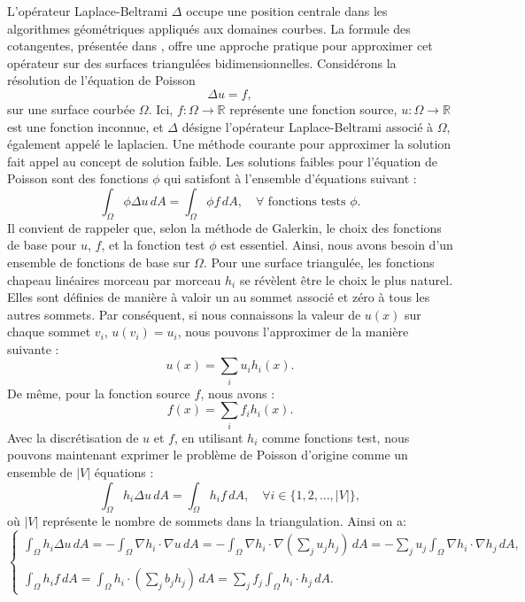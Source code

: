 L'opérateur Laplace-Beltrami $\Delta$ occupe une position centrale dans les algorithmes géométriques appliqués aux domaines courbes. La formule des cotangentes, présentée dans \cite{operatorlecture, crane2019n}, offre une approche pratique pour approximer cet opérateur sur des surfaces triangulées bidimensionnelles. Considérons la résolution de l'équation de Poisson
\[ \Delta u = f, \]
sur une surface courbée $\Omega$. Ici, $f : \Omega \rightarrow \mathbb{R}$ représente une fonction source, $u : \Omega \rightarrow \mathbb{R}$ est une fonction inconnue, et $\Delta$ désigne l'opérateur Laplace-Beltrami associé à $\Omega$, également appelé le laplacien. Une méthode courante pour approximer la solution fait appel au concept de solution faible. Les solutions faibles pour l'équation de Poisson sont des fonctions $\phi$ qui satisfont à l'ensemble d'équations suivant :
\[ \int_{\Omega} \phi \Delta u \,dA = \int_{\Omega} \phi f \,dA, \quad \forall \text{ fonctions tests } \phi .\]
Il convient de rappeler que, selon la méthode de Galerkin, le choix des fonctions de base pour $u$, $f$, et la fonction test $\phi$ est essentiel. Ainsi, nous avons besoin d'un ensemble de fonctions de base sur $\Omega$. Pour une surface triangulée, les fonctions chapeau linéaires morceau par morceau $h_i$ se révèlent être le choix le plus naturel. Elles sont définies de manière à valoir un au sommet associé et zéro à tous les autres sommets. Par conséquent, si nous connaissons la valeur de $u(x)$ sur chaque sommet $v_i$, $u(v_i) = u_i$, nous pouvons l'approximer de la manière suivante :
\[ u(x) = \sum_{i} u_ih_i(x) .\]
De même, pour la fonction source $f$, nous avons :
\[ f(x) = \sum_{i} f_ih_i(x). \]
Avec la discrétisation de $u$ et $f$, en utilisant $h_i$ comme fonctions test, nous pouvons maintenant exprimer le problème de Poisson d'origine comme un ensemble de $|V|$ équations :
\[ \int_{\Omega} h_i\Delta u \,dA = \int_{\Omega} h_if \,dA, \quad \forall i \in \{1, 2, . . . , |V|\},\]
où $|V|$ représente le nombre de sommets dans la triangulation.
 Ainsi on a:
\begin{equation}
\left\{
\begin{array}{l}
    \displaystyle\int_{\Omega} h_i\Delta u \,dA = - \int_{\Omega} \nabla h_i \cdot \nabla u \,dA = - \int_{\Omega} \nabla h_i \cdot \nabla \left(\sum_{j} u_j h_j\right) \,dA = - \sum_{j} u_j \int_{\Omega} \nabla h_i \cdot \nabla h_j \,dA,\\\\
    \displaystyle\int_{\Omega} h_if \,dA = \int_{\Omega} h_i \cdot \left(\sum_{j} b_j h_j\right) \,dA = \sum_{j} f_j \int_{\Omega} h_i \cdot h_j \,dA.
\end{array}
\right.
\end{equation}
